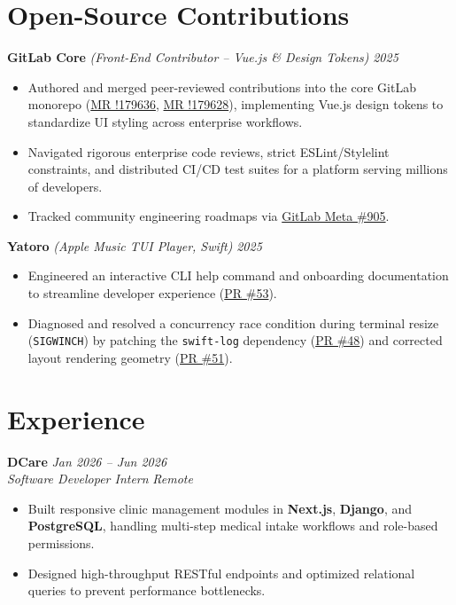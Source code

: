 \documentclass[10pt,a4paper]{article}
\begin{document}
\section{Open-Source Contributions}
\textbf{GitLab Core} \textit{(Front-End Contributor -- Vue.js \& Design Tokens)} \hfill \textit{2025}
\begin{itemize}
    \item Authored and merged peer-reviewed contributions into the core GitLab monorepo (\href{https://gitlab.com/gitlab-org/gitlab/-/merge_requests/179636}{MR !179636}, \href{https://gitlab.com/gitlab-org/gitlab/-/merge_requests/179628}{MR !179628}), implementing Vue.js design tokens to standardize UI styling across enterprise workflows.
    \item Navigated rigorous enterprise code reviews, strict ESLint/Stylelint constraints, and distributed CI/CD test suites for a platform serving millions of developers.
    \item Tracked community engineering roadmaps via \href{https://gitlab.com/gitlab-community/meta/-/work_items/905}{GitLab Meta \#905}.
\end{itemize}

\textbf{Yatoro} \textit{(Apple Music TUI Player, Swift)} \hfill \textit{2025}
\begin{itemize}
    \item Engineered an interactive CLI help command and onboarding documentation to streamline developer experience (\href{https://github.com/jayadamsmorgan/Yatoro/pull/53}{PR \#53}).
    \item Diagnosed and resolved a concurrency race condition during terminal resize (\texttt{SIGWINCH}) by patching the \texttt{swift-log} dependency (\href{https://github.com/jayadamsmorgan/Yatoro/pull/48}{PR \#48}) and corrected layout rendering geometry (\href{https://github.com/jayadamsmorgan/Yatoro/pull/51}{PR \#51}).
\end{itemize}

\section{Experience}
\textbf{DCare} \hfill \textit{Jan 2026 -- Jun 2026} \\
\textit{Software Developer Intern} \hfill \textit{Remote}
\begin{itemize}
    \item Built responsive clinic management modules in \textbf{Next.js}, \textbf{Django}, and \textbf{PostgreSQL}, handling multi-step medical intake workflows and role-based permissions.
    \item Designed high-throughput RESTful endpoints and optimized relational queries to prevent performance bottlenecks.
\end{itemize}
\end{document}
